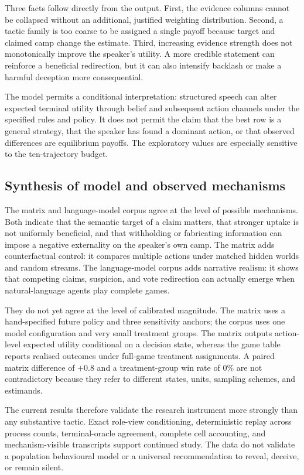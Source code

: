 \documentclass[11pt,a4paper]{article}
\begin{document}
Three facts follow directly from the output. First, the evidence columns cannot be collapsed without an additional, justified weighting distribution. Second, a tactic family is too coarse to be assigned a single payoff because target and claimed camp change the estimate. Third, increasing evidence strength does not monotonically improve the speaker's utility. A more credible statement can reinforce a beneficial redirection, but it can also intensify backlash or make a harmful deception more consequential.

The model permits a conditional interpretation: structured speech can alter expected terminal utility through belief and subsequent action channels under the specified rules and policy. It does not permit the claim that the best row is a general strategy, that the speaker has found a dominant action, or that observed differences are equilibrium payoffs. The exploratory values are especially sensitive to the ten-trajectory budget.

\subsection{Synthesis of model and observed mechanisms}

The matrix and language-model corpus agree at the level of possible mechanisms. Both indicate that the semantic target of a claim matters, that stronger uptake is not uniformly beneficial, and that withholding or fabricating information can impose a negative externality on the speaker's own camp. The matrix adds counterfactual control: it compares multiple actions under matched hidden worlds and random streams. The language-model corpus adds narrative realism: it shows that competing claims, suspicion, and vote redirection can actually emerge when natural-language agents play complete games.

They do not yet agree at the level of calibrated magnitude. The matrix uses a hand-specified future policy and three sensitivity anchors; the corpus uses one model configuration and very small treatment groups. The matrix outputs action-level expected utility conditional on a decision state, whereas the game table reports realised outcomes under full-game treatment assignments. A paired matrix difference of $+0.8$ and a treatment-group win rate of 0\% are not contradictory because they refer to different states, units, sampling schemes, and estimands.

The current results therefore validate the research instrument more strongly than any substantive tactic. Exact role-view conditioning, deterministic replay across process counts, terminal-oracle agreement, complete cell accounting, and mechanism-visible transcripts support continued study. The data do not validate a population behavioural model or a universal recommendation to reveal, deceive, or remain silent.
\end{document}

